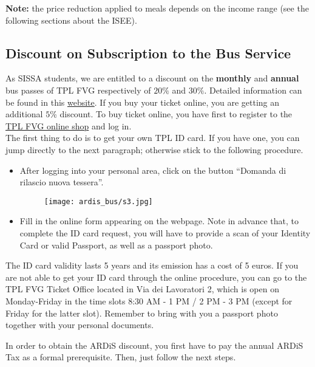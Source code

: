 \documentclass{sissavademecum}
\begin{document}
\textbf{Note:} the price reduction applied to meals depends on the income range (see the following sections about the ISEE).

\subsection{Discount on Subscription to the Bus Service}

As SISSA students, we are entitled to a discount on the \textbf{monthly} and \textbf{annual} bus passes of TPL FVG respectively of $20\%$ and $30\%$. Detailed information can be found in this \href{http://www.ardiss.fvg.it/contenuti.php?view=page&id=215}{website}. If you buy your ticket online, you are getting an additional $5$\% discount. To buy ticket online, you have first to register to the \href{https://tplfvg.it/it/le-tariffe/acquisto-web/}{TPL FVG online shop} and log in. \\

The first thing to do is to get your own TPL ID card. If you have one, you can jump directly to the next paragraph; otherwise stick to the following procedure.

\begin{itemize}
    \item After logging into your personal area, click on the button ``Domanda di rilascio nuova tessera''.
    \begin{figure}[!htp] 
        \begin{center}
            \texttt{[image: ardis\_bus/s3.jpg]}
        \end{center}
    \end{figure}
    \item Fill in the online form appearing on the webpage. Note in advance that, to complete the ID card request, you will have to provide a scan of your Identity Card or valid Passport, as well as a passport photo.
\end{itemize}

The ID card validity lasts 5 years and its emission has a cost of 5 euros. If you are not able to get your ID card through the online procedure, you can go to the TPL FVG Ticket Office located in Via dei Lavoratori 2, which is open on Monday-Friday in the time slots 8:30 AM - 1 PM / 2 PM - 3 PM (except for Friday for the latter slot). Remember to bring with you a passport photo together with your personal documents.

In order to obtain the ARDiS discount, you first have to pay the annual ARDiS Tax as a formal prerequisite. Then, just follow the next steps.
\end{document}
